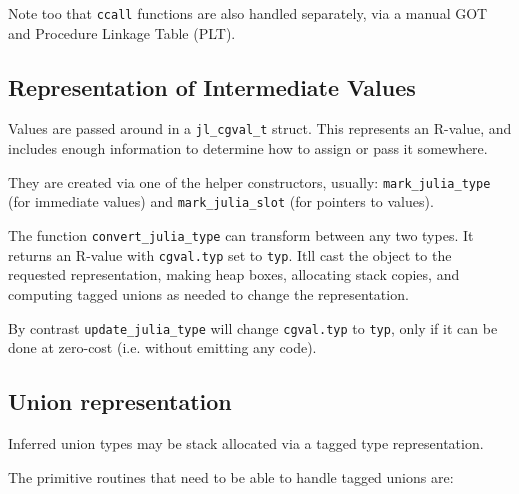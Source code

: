 Note too that \texttt{ccall} functions are also handled separately, via a manual GOT and Procedure Linkage Table (PLT).



\hypertarget{9352283582715079729}{}


\subsection{Representation of Intermediate Values}



Values are passed around in a \texttt{jl\_cgval\_t} struct. This represents an R-value, and includes enough information to determine how to assign or pass it somewhere.



They are created via one of the helper constructors, usually: \texttt{mark\_julia\_type} (for immediate values) and \texttt{mark\_julia\_slot} (for pointers to values).



The function \texttt{convert\_julia\_type} can transform between any two types. It returns an R-value with \texttt{cgval.typ} set to \texttt{typ}. It{\textquotesingle}ll cast the object to the requested representation, making heap boxes, allocating stack copies, and computing tagged unions as needed to change the representation.



By contrast \texttt{update\_julia\_type} will change \texttt{cgval.typ} to \texttt{typ}, only if it can be done at zero-cost (i.e. without emitting any code).



\hypertarget{3738811278233217209}{}


\subsection{Union representation}



Inferred union types may be stack allocated via a tagged type representation.



The primitive routines that need to be able to handle tagged unions are:



